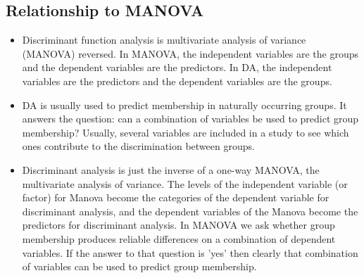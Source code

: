 \subsection{Relationship to MANOVA}
\begin{itemize}
\item Discriminant function analysis is multivariate analysis of variance (MANOVA)
reversed. In MANOVA, the independent variables are the groups and the
dependent variables are the predictors. In DA, the independent variables are the
predictors and the dependent variables are the groups. 
\item  DA is usually used to predict membership in naturally occurring
groups. It answers the question: can a combination of variables be used to
predict group membership? Usually, several variables are included in a study to
see which ones contribute to the discrimination between groups.
\item Discriminant analysis is just the inverse of a one-way MANOVA, the multivariate analysis of variance. The levels of the independent variable (or factor) for Manova become the categories of the dependent variable for discriminant analysis, and the dependent variables of the Manova become the predictors for discriminant analysis. In MANOVA we ask whether group membership produces reliable differences on a combination of dependent variables. If the answer to that question is 'yes' then clearly that combination of variables can be used to predict group membership. 
\end{itemize}
